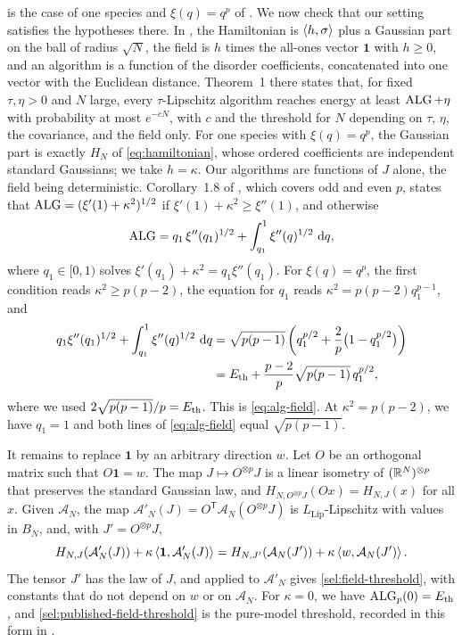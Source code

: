  is the case of one species and
$\xi(q)=q^p$ of \cite[Theorem~1 and Corollary~1.8]{hs2023}. We now check
that our setting satisfies the hypotheses there.
In \cite{hs2023}, the Hamiltonian is $\left\langle h,\sigma\right\rangle$ plus a Gaussian part
on the ball of radius $\sqrt N$, the field is $h$ times the all-ones vector
$\mathbf 1$ with $h\ge0$, and an algorithm is a function of the disorder
coefficients, concatenated into one vector with the Euclidean distance.
Theorem~1 there states that, for fixed $\tau,\eta>0$ and $N$ large, every
$\tau$-Lipschitz algorithm reaches energy at least $\operatorname{ALG}+\eta$ with
probability at most $e^{-cN}$, with $c$ and the threshold for $N$ depending
on $\tau$, $\eta$, the covariance, and the field only. For one species with
$\xi(q)=q^p$, the Gaussian part is exactly $H_N$ of \eqref{eq:hamiltonian},
whose ordered coefficients are independent standard Gaussians; we take
$h=\kappa$. Our algorithms are functions of $J$ alone, the field being
deterministic. Corollary~1.8 of \cite{hs2023}, which covers odd and even
$p$, states that $\operatorname{ALG}=(\xi'(1)+\kappa^2)^{1/2}$ if
$\xi'(1)+\kappa^2\ge\xi''(1)$, and otherwise
\[
 \operatorname{ALG}=q_1\,\xi''(q_1)^{1/2}+\int_{q_1}^1\xi''(q)^{1/2}\,\mathop{}\!\mathrm d q,
\]
where $q_1\in[0,1)$ solves $\xi'(q_1)+\kappa^2=q_1\xi''(q_1)$. For
$\xi(q)=q^p$, the first condition reads $\kappa^2\ge p(p-2)$, the equation
for $q_1$ reads $\kappa^2=p(p-2)q_1^{p-1}$, and
\[
\begin{aligned}
 q_1\xi''(q_1)^{1/2}+\int_{q_1}^1\xi''(q)^{1/2}\,\mathop{}\!\mathrm d q
 &=\sqrt{p(p-1)}\left(q_1^{p/2}+\frac2p\big(1-q_1^{p/2}\big)\right)\\
 &=E_{\mathrm{th}}+\frac{p-2}p\sqrt{p(p-1)}\,q_1^{p/2},
\end{aligned}
\]
where we used $2\sqrt{p(p-1)}/p=E_{\mathrm{th}}$. This is \eqref{eq:alg-field}. At
$\kappa^2=p(p-2)$, we have $q_1=1$ and both lines of \eqref{eq:alg-field}
equal $\sqrt{p(p-1)}$.

It remains to replace $\mathbf 1$ by an arbitrary direction $w$. Let $O$ be
an orthogonal matrix such that $O\mathbf 1=w$. The map $J\mapsto O^{\otimes p}J$ is
a linear isometry of $(\mathbb R^N)^{\otimes p}$ that preserves the standard
Gaussian law, and $H_{N,O^{\otimes p}J}(Ox)=H_{N,J}(x)$ for all $x$. Given
$\mathcal A_N$, the map $\mathcal A'_N(J)=O^{\mathsf T}\mathcal A_N(O^{\otimes p}J)$
is $L_{\mathrm{Lip}}$-Lipschitz with values in $B_N$, and, with $J'=O^{\otimes p}J$,
\[
 H_{N,J}(\mathcal A'_N(J))+\kappa\left\langle\mathbf 1,\mathcal A'_N(J)\right\rangle
 =H_{N,J'}(\mathcal A_N(J'))+\kappa\left\langle w,\mathcal A_N(J')\right\rangle.
\]
The tensor $J'$ has the law of $J$, and \cite[Theorem~1]{hs2023} applied to
$\mathcal A'_N$ gives \eqref{sel:field-threshold}, with constants that do
not depend on $w$ or on $\mathcal A_N$. For $\kappa=0$, we have
$\operatorname{ALG}_p(0)=E_{\mathrm{th}}$, and \cref{sel:published-field-threshold} is the
pure-model threshold, recorded in this form in
\cite[Proposition~1.9]{sellke2024}.

